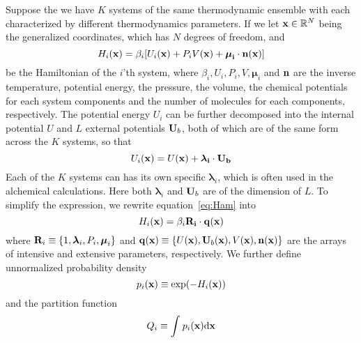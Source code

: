 Suppose the we have $K$ systems of the same thermodynamic ensemble with
each characterized by different thermodynamics parameters. If we let $\mathbf{x} \in
 \mathbb{R}^{N}$ being the generalized coordinates, which has $N$  degrees of 
 freedom, and
\begin{equation}\label{eq:Ham}
H_{i}(\mathbf{x}) = \beta_{i}[ U_{i}(\mathbf{x}) + P_{i}V(\mathbf{x}) + \mathbf{\boldsymbol\mu_{i}}\cdot\mathbf{\mathbf{n}(\mathbf{x})}]
\end{equation}
be the Hamiltonian of the $i$'th system, where $\beta_{i}, U_{i}, P_{i}, V, \boldsymbol\mu_{i}$
and $\mathbf{n}$ are the inverse temperature, potential energy, the pressure, the volume, the chemical
potentials for each system components and the number of molecules for each components, 
respectively. The potential energy $U_{i}$ can be further decomposed into 
the internal potential $U$ and $L$ external potentials $\mathbf{U}_{b}$, both 
of which are of the same form across the $K$ systems, so that 
\begin{equation}\label{eq:Pot}
U_{i}(\mathbf{x}) = U(\mathbf{x}) + \mathbf{\boldsymbol\lambda_{i}}\cdot\mathbf{\mathbf{U}_{b}}
\end{equation} 
Each of the $K$ systems can has its own specific $\boldsymbol\lambda_{i}$,  
which is often used in the alchemical calculations. Here both $\boldsymbol\lambda_{i}$ 
and $\mathbf{U}_{b}$ are of the dimension of $L$. To simplify the expression, 
we rewrite equation~\ref{eq:Ham} into
\begin{equation}\label{eq:simHam}
H_{i}(\mathbf{x}) = \beta_{i}\mathbf{\mathbf{R}_{i}}\cdot\mathbf{\mathbf{q}(\mathbf{x})}
\end{equation}
where $\mathbf{R}_{i} \equiv \{1, \boldsymbol\lambda_{i}, P_{i}, \boldsymbol\mu_{i}\}$
and $\mathbf{q}(\mathbf{x}) \equiv \{U(\mathbf{x}), \mathbf{U}_{b}(\mathbf{x}), V(\mathbf{x}), \mathbf{n}(\mathbf{x})\}$
are the arrays of intensive and extensive parameters, respectively. 
We further define unnormalized probability density 
\begin{equation}
p_{i}(\mathbf{x}) \equiv \exp(-H_{i}(\mathbf{x}))
\end{equation}
and the partition function
\begin{equation}
Q_{i} \equiv \int_{}^{}{p_{i}}(\mathbf{x})\mathrm{d}\mathbf{x} 
\end{equation}

